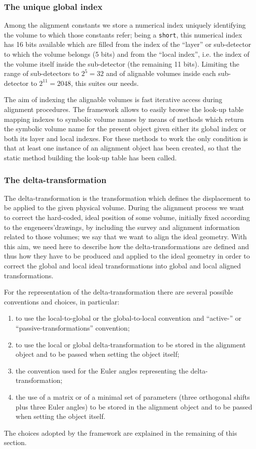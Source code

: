 \documentclass[12pt,a4paper,twoside]{article}
\begin{document}
{\subsubsection{The unique global index}
Among the alignment constants we store a numerical index uniquely
identifying the volume to which those constants refer; being a
\lstinline!short!, this numerical index has 16 bits available which
are filled from the index of the ``layer'' or sub-detector to which
the volume belongs (5 bits) and from the ``local index'', i.e. the
index of the volume itself inside the sub-detector (the remaining 11
bits). Limiting the range of sub-detectors to $2^5=32$ and of
alignable volumes inside each sub-detector to $2^{11}=2048$, this
suites our needs.

The aim of indexing the alignable volumes is fast iterative access
during alignment procedures. The framework allows to easily
browse the look-up table mapping indexes to symbolic volume names by
means of methods which return the symbolic volume name for the present
object given either its global index or both its layer and local
indexes. For these methods to work the only condition is that at least
one instance of an alignment object has been created, so that the
static method building the look-up table has been called.


\subsubsection{The delta-transformation}
\label{ssec:delta}
The delta-transformation is the transformation which defines the
displacement to be applied to the given physical volume.
During the alignment process we want to correct the hard-coded, ideal
position of some volume, initially fixed according to the
engeneers'drawings, by including the survey and alignment information
related to those volumes; we say that we want to align the ideal
geometry. With this aim, we need here to describe how the
delta-transformations are defined and thus how they have to be produced and
applied to the ideal geometry in order to correct the global and local
ideal transformations into global and local aligned transformations.

For the representation of the delta-transformation there are several
possible conventions and choices, in particular: 
\begin{enumerate}
  \item to use the local-to-global or the global-to-local convention and
    ``active-'' or ``passive-transformations'' convention;
  \item to use the local or global delta-transformation to be stored in the
    alignment object and to be passed when setting the object itself;
  \item the convention used for the Euler angles representing the
    delta-transformation;
  \item the use of a matrix or of a minimal set of parameters (three
    orthogonal shifts plus three Euler angles) to be stored in the
    alignment object and to be passed when setting the object itself.
\end{enumerate}
The choices adopted by the framework are explained in the remaining of
this section.

}
\end{document}
